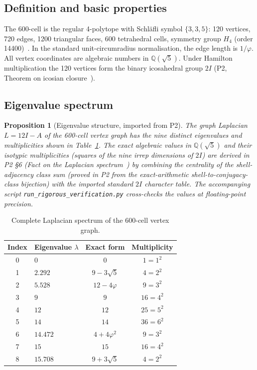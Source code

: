 \documentclass[12pt]{article}
\newtheorem{proposition}[theorem]{Proposition}
\newcommand{\phig}{\varphi}
\begin{document}
\subsection{Definition and basic properties}

The 600-cell is the regular 4-polytope with Schl\"afli symbol $\{3,3,5\}$: 120 vertices, 720 edges, 1200 triangular faces, 600 tetrahedral cells, symmetry group $H_4$ (order 14400)~\citep{Coxeter1973}. In the standard unit-circumradius normalisation, the edge length is $1/\phig$. All vertex coordinates are algebraic numbers in $\mathbb{Q}(\sqrt{5})$. Under Hamilton multiplication the 120 vertices form the binary icosahedral group $2I$ (P2, Theorem on icosian closure~\citep{CascadeAlgSubstrate}).

\subsection{Eigenvalue spectrum}

\begin{proposition}[Eigenvalue structure, imported from P2]\label{thm:eigenvalues}
The graph Laplacian $L = 12I - A$ of the 600-cell vertex graph has the nine distinct eigenvalues and multiplicities shown in Table~\ref{tab:spectrum}. The exact algebraic values in $\mathbb{Q}(\sqrt 5)$ and their isotypic multiplicities (squares of the nine irrep dimensions of $2I$) are derived in P2 \S 6 (Fact on the Laplacian spectrum~\citep{CascadeAlgSubstrate}) by combining the centrality of the shell-adjacency class sum (proved in P2 from the exact-arithmetic shell-to-conjugacy-class bijection) with the imported standard $2I$ character table. The accompanying script \texttt{run\_rigorous\_verification.py} cross-checks the values at floating-point precision.
\end{proposition}

\begin{table}[ht]
\centering
\caption{Complete Laplacian spectrum of the 600-cell vertex graph.}
\label{tab:spectrum}
\begin{tabular}{@{}clcc@{}}
\toprule
Index & Eigenvalue $\lambda$ & Exact form & Multiplicity \\
\midrule
0 & $0$ & $0$ & $1 = 1^2$ \\
1 & $2.292$ & $9 - 3\sqrt{5}$ & $4 = 2^2$ \\
2 & $5.528$ & $12 - 4\phig$ & $9 = 3^2$ \\
3 & $9$ & $9$ & $16 = 4^2$ \\
4 & $12$ & $12$ & $25 = 5^2$ \\
5 & $14$ & $14$ & $36 = 6^2$ \\
6 & $14.472$ & $4 + 4\phig^2$ & $9 = 3^2$ \\
7 & $15$ & $15$ & $16 = 4^2$ \\
8 & $15.708$ & $9 + 3\sqrt{5}$ & $4 = 2^2$ \\
\bottomrule
\end{tabular}
\end{table}
\end{document}
